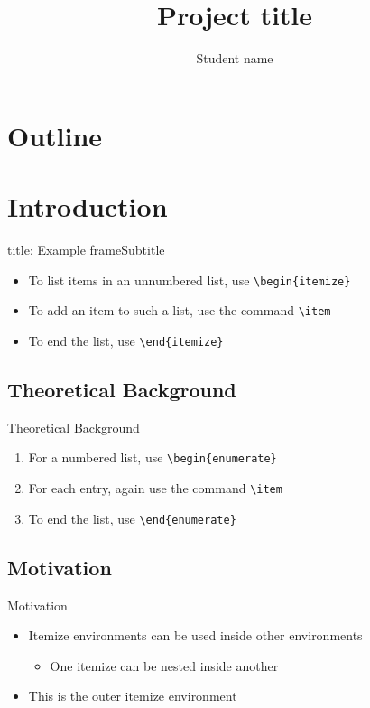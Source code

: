 \documentclass[xcolor=dvipsnames, compress]{beamer}
\title[short title]{Project title}
\author{Student name}
\begin{document}
\begin{frame}
\titlepage
\end{frame}

\section*{Outline}
\begin{frame}
\tableofcontents[]
\end{frame}

\section{Introduction}

\begin{frame}[fragile]{title: Example frame}{Subtitle}
	\begin{itemize}
	\item To list items in an unnumbered list, use \verb^\begin{itemize}^
	\item To add an item to such a list, use the command \verb|\item|
	\item To end the list, use \verb!\end{itemize}!
	\end{itemize}
\end{frame}

\subsection{Theoretical Background}

\begin{frame}[fragile]{Theoretical Background}
	\begin{enumerate}
	\item For a numbered list, use \verb^\begin{enumerate}^
	\item For each entry, again use the command \verb#\item#
	\item To end the list, use \verb!\end{enumerate}!
	\end{enumerate}
\end{frame}


\subsection{Motivation}
\begin{frame}{Motivation}
	\begin{itemize}
	\item Itemize environments can be used inside other environments
	\begin{itemize}
	\item One itemize can be nested inside another 
	\end{itemize}
	\item This is the outer itemize environment
	\end{itemize}
\end{frame}
\end{document}
